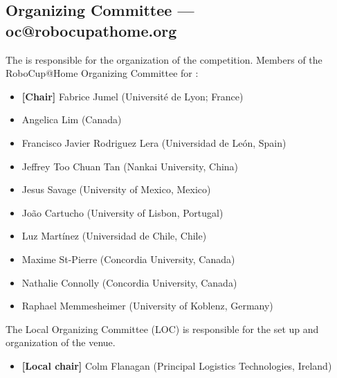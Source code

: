 \subsection{Organizing Committee --- oc@robocupathome.org}
\label{sec:oc}
The  is responsible for the organization of the competition. Members of the RoboCup@Home Organizing Committee for \YEAR:

\begin{itemize}
	\item \textbf{[Chair]} Fabrice Jumel (Université de Lyon; France)
	\item Angelica Lim (Canada)
	\item Francisco Javier Rodriguez Lera (Universidad de León, Spain)
	\item Jeffrey Too Chuan Tan (Nankai University, China)
	\item Jesus Savage (University of Mexico, Mexico)
	\item João Cartucho (University of Lisbon, Portugal)
	\item Luz Martínez (Universidad de Chile, Chile)
	\item Maxime St-Pierre (Concordia University, Canada)
	\item Nathalie Connolly (Concordia University, Canada)
	\item Raphael Memmesheimer (University of Koblenz, Germany)
\end{itemize}

The Local Organizing Committee (LOC) is responsible for the set up and organization of the venue.
\begin{itemize}
	\item \textbf{[Local chair]} Colm Flanagan (Principal Logistics Technologies, Ireland)
\end{itemize}
